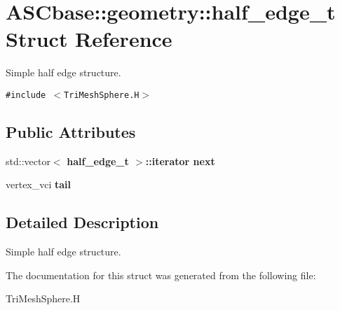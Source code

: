 \section{ASCbase::geometry::half\_\-edge\_\-t Struct Reference}
\label{structASCbase_1_1geometry_1_1half__edge__t}
Simple half edge structure.  


{\tt \#include $<$Tri\-Mesh\-Sphere.H$>$}

\subsection*{Public Attributes}
\begin{CompactItemize}
\item 
std::vector$<$ \bf{half\_\-edge\_\-t} $>$::iterator \textbf{next}\label{structASCbase_1_1geometry_1_1half__edge__t_b9c1024184c488466c7e8f0f155ea959}

\item 
vertex\_\-vci \textbf{tail}\label{structASCbase_1_1geometry_1_1half__edge__t_24e846910bcc790ee9eb33bd0995b336}

\end{CompactItemize}


\subsection{Detailed Description}
Simple half edge structure. 



The documentation for this struct was generated from the following file:\begin{CompactItemize}
\item 
Tri\-Mesh\-Sphere.H\end{CompactItemize}
